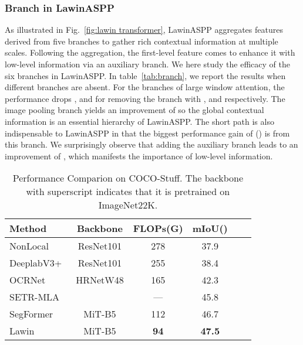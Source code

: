 \documentclass[10pt,twocolumn,letterpaper]{article}
\begin{document}
\subsubsection{Branch in LawinASPP}
\label{sec:4.3.3}
As illustrated in Fig.~\ref{fig:lawin transformer}, LawinASPP aggregates features derived from five branches to gather rich contextual information at multiple scales. Following the aggregation, the first-level feature comes to enhance it with low-level information via an auxiliary branch. We here study the efficacy of the six branches in LawinASPP. In table~\ref{tab:branch}, we report the results when different branches are absent. For the branches of large window attention, the performance drops ,  and  for removing the branch with ,  and  respectively. The image pooling branch yields an improvement of  so the global contextual information is an essential hierarchy of LawinASPP. The short path is also indispensable to LawinASPP in that the biggest performance gain of () is from this branch. We surprisingly observe that adding the auxiliary branch leads to an improvement of , which manifests the importance of low-level information. 



\begin{table}
\small
  \centering
  \renewcommand\arraystretch{1.15}
  
  \begin{tabular}{lccccc} \hline 
  
  \hline
  \small{Method} & Backbone & FLOPs(G) & mIoU() \\
\hline
   NonLocal~\cite{wang2018non}  & ResNet101 & 278 & 37.9\\
DeeplabV3+~\cite{chen2018encoder}  & ResNet101 & 255  & 38.4 \\
   OCRNet~\cite{yuan2020object}  & HRNetW48 & 165 & 42.3 \\
   \hline
   SETR-MLA~\cite{zheng2021rethinking}  &  & --- & 45.8 \\
   SegFormer~\cite{xie2021segformer}  & MiT-B5 & 112 & 46.7\\
   Lawin  & MiT-B5 & \textbf{94} & \textbf{47.5}\\
  \hline
  
  
  \hline
  
  \end{tabular}
  \caption{Performance Comparion on COCO-Stuff. The backbone with superscript  indicates that it is pretrained on ImageNet22K.}
  \label{tab:coco}
\end{table}
\end{document}
